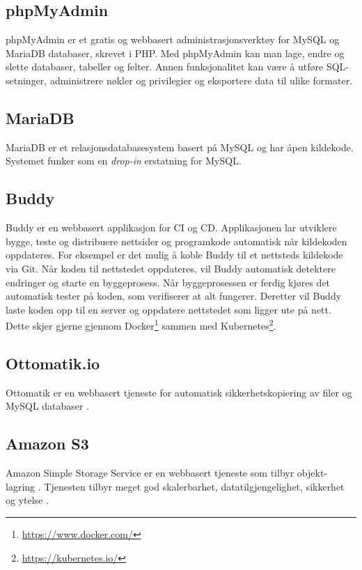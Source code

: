 \subsection{phpMyAdmin}
phpMyAdmin \cite{phpmyadmin2019bmt} er et gratis og webbasert administrasjonsverktøy for MySQL og MariaDB databaser, skrevet i PHP. Med phpMyAdmin kan man lage, endre og slette databaser, tabeller og felter. Annen funksjonalitet kan være å utføre SQL-setninger, administrere nøkler og privilegier og eksportere data til ulike formater.

\subsection{MariaDB}
MariaDB \cite{mariadb2019amd} er et relasjonsdatabasesystem basert på MySQL og har åpen kildekode. Systemet funker som en \textit{drop-in} erstatning for MySQL.

\subsection{Buddy}
Buddy \cite{buddy2019das} er en webbasert applikasjon for CI og CD. Applikasjonen lar utviklere bygge, teste og distribuere nettsider og programkode automatisk når kildekoden oppdateres. For eksempel er det mulig å koble Buddy til et nettsteds kildekode via Git. Når koden til nettstedet oppdateres, vil Buddy automatisk detektere endringer og starte en byggeprosess. Når byggeprosessen er ferdig kjøres det automatisk tester på koden, som verifiserer at alt fungerer. Deretter vil Buddy laste koden opp til en server og oppdatere nettstedet som ligger ute på nett. Dette skjer gjerne gjennom Docker\footnote{\url{https://www.docker.com/}} sammen med Kubernetes\footnote{\url{https://kubernetes.io/}}.

\subsection{Ottomatik.io}
Ottomatik er en webbasert tjeneste for automatisk sikkerhetskopiering av filer og MySQL databaser \cite{barnes2016osb}.

\subsection{Amazon S3}
Amazon Simple Storage Service er en webbasert tjeneste som tilbyr objekt-lagring \cite{aws2019as3}. Tjenesten tilbyr meget god skalerbarhet, datatilgjengelighet, sikkerhet og ytelse \cite{garfinkel2007aeagcs}.

